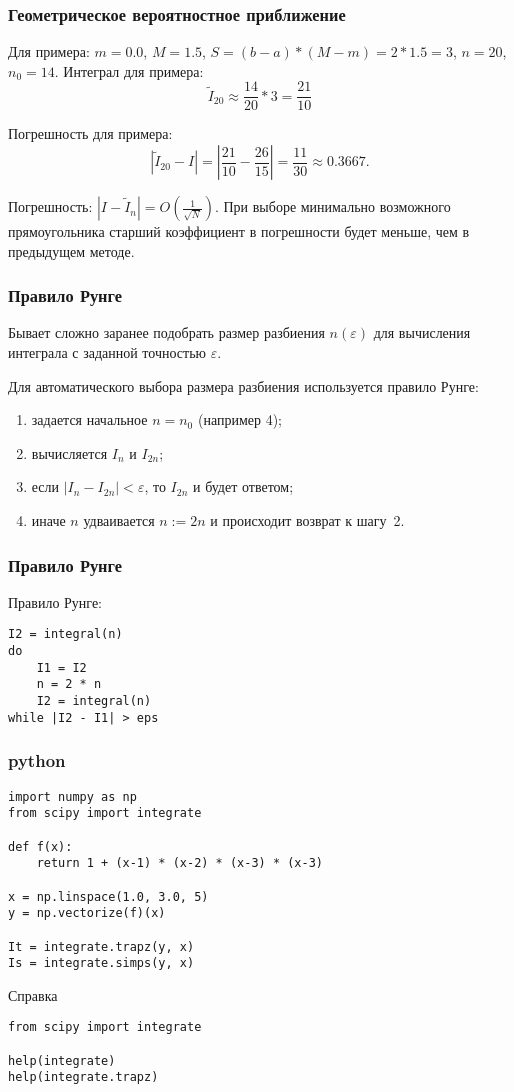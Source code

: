 \documentclass[10pt]{beamer}
\begin{document}
\begin{frame}[fragile]
\frametitle{Геометрическое вероятностное приближение}
Для примера: $m = 0.0$, $M = 1.5$, $S = (b-a) * (M-m) = 2 * 1.5 = 3$, $n = 20$, $n_0 = 14$. Интеграл для примера:
$$\tilde{I}_{20} \approx \frac{14}{20} * 3 = \frac{21}{10}$$

Погрешность для примера:
$$|\tilde{I}_{20} - I| = \left|\frac{21}{10} - \frac{26}{15}\right| = \frac{11}{30} \approx 0.3667 .$$


Погрешность: $|I - \tilde{I}_n| = O \left( \frac{1}{\sqrt{N}} \right)$. При выборе минимально возможного прямоугольника старший коэффициент в погрешности будет меньше, чем в предыдущем методе.
\end{frame}

\begin{frame}[fragile]
\frametitle{Правило Рунге}
Бывает сложно заранее подобрать размер разбиения $n(\varepsilon)$ для вычисления интеграла с заданной точностью $\varepsilon$. 

Для автоматического выбора размера разбиения используется правило Рунге:
\begin{enumerate}
\item задается начальное $n = n_0$ (например 4);
\item вычисляется $I_n$ и $I_{2n}$;
\item если $|I_n - I_{2n}| < \varepsilon$, то $I_{2n}$ и будет ответом;
\item иначе $n$ удваивается $n := 2n$ и происходит возврат к шагу~2.
\end{enumerate}

\end{frame}

\begin{frame}[fragile]
\frametitle{Правило Рунге}

Правило Рунге:
\begin{lstlisting}
I2 = integral(n)
do
    I1 = I2
    n = 2 * n
    I2 = integral(n)
while |I2 - I1| > eps
\end{lstlisting}

\end{frame}

\begin{frame}[fragile]
\frametitle{python}

\begin{lstlisting}
import numpy as np
from scipy import integrate

def f(x):
	return 1 + (x-1) * (x-2) * (x-3) * (x-3)

x = np.linspace(1.0, 3.0, 5)
y = np.vectorize(f)(x)

It = integrate.trapz(y, x)
Is = integrate.simps(y, x)

\end{lstlisting}

Справка
\begin{lstlisting}
from scipy import integrate

help(integrate)
help(integrate.trapz)
\end{lstlisting}
\end{frame}
\end{document}
